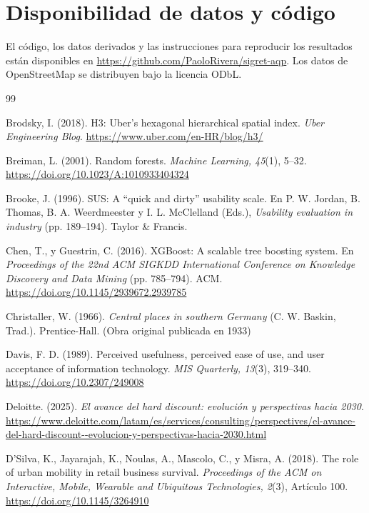 \documentclass[10pt,letterpaper,twocolumn]{article}
\begin{document}
\section*{Disponibilidad de datos y código}
El código, los datos derivados y las instrucciones para reproducir los resultados están disponibles en \url{https://github.com/PaoloRivera/sigret-aqp}. Los datos de OpenStreetMap se distribuyen bajo la licencia ODbL.

\balance
\begin{thebibliography}{99}
\footnotesize
\setlength{\parindent}{-0.45cm}\setlength{\leftskip}{0.45cm}

 Brodsky, I. (2018). H3: Uber's hexagonal hierarchical spatial index. \textit{Uber Engineering Blog}. \url{https://www.uber.com/en-HR/blog/h3/}

 Breiman, L. (2001). Random forests. \textit{Machine Learning, 45}(1), 5--32. \url{https://doi.org/10.1023/A:1010933404324}

 Brooke, J. (1996). SUS: A ``quick and dirty'' usability scale. En P. W. Jordan, B. Thomas, B. A. Weerdmeester y I. L. McClelland (Eds.), \textit{Usability evaluation in industry} (pp. 189--194). Taylor \& Francis.

 Chen, T., y Guestrin, C. (2016). XGBoost: A scalable tree boosting system. En \textit{Proceedings of the 22nd ACM SIGKDD International Conference on Knowledge Discovery and Data Mining} (pp. 785--794). ACM. \url{https://doi.org/10.1145/2939672.2939785}

 Christaller, W. (1966). \textit{Central places in southern Germany} (C. W. Baskin, Trad.). Prentice-Hall. (Obra original publicada en 1933)

 Davis, F. D. (1989). Perceived usefulness, perceived ease of use, and user acceptance of information technology. \textit{MIS Quarterly, 13}(3), 319--340. \url{https://doi.org/10.2307/249008}

 Deloitte. (2025). \textit{El avance del hard discount: evolución y perspectivas hacia 2030}. \url{https://www.deloitte.com/latam/es/services/consulting/perspectives/el-avance-del-hard-discount--evolucion-y-perspectivas-hacia-2030.html}

 D'Silva, K., Jayarajah, K., Noulas, A., Mascolo, C., y Misra, A. (2018). The role of urban mobility in retail business survival. \textit{Proceedings of the ACM on Interactive, Mobile, Wearable and Ubiquitous Technologies, 2}(3), Artículo 100. \url{https://doi.org/10.1145/3264910}


\end{thebibliography}
\end{document}
